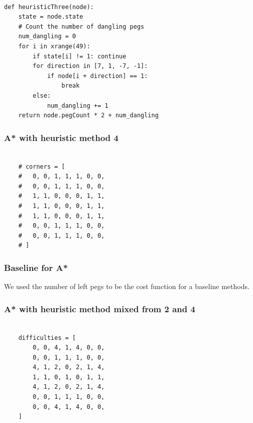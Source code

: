 \documentclass[11pt,letter]{article}
\begin{document}
\begin{lstlisting}[frame=single]  % Start your code-block

def heuristicThree(node):
	state = node.state
	# Count the number of dangling pegs
	num_dangling = 0
	for i in xrange(49):
		if state[i] != 1: continue
		for direction in [7, 1, -7, -1]:
			if node[i + direction] == 1:
				break
		else:
			num_dangling += 1
	return node.pegCount * 2 + num_dangling
\end{lstlisting}
\subsubsection {A* with heuristic method 4}

\begin{lstlisting}[frame=single]  % Start your code-block

	# corners = [
	# 	0, 0, 1, 1, 1, 0, 0,
	# 	0, 0, 1, 1, 1, 0, 0,
	# 	1, 1, 0, 0, 0, 1, 1,
	# 	1, 1, 0, 0, 0, 1, 1,
	# 	1, 1, 0, 0, 0, 1, 1,
	# 	0, 0, 1, 1, 1, 0, 0,
	# 	0, 0, 1, 1, 1, 0, 0,
	# ]
\end{lstlisting}
\subsubsection {Baseline for A*}
We used the number of left pegs to be the cost function for a baseline methods.

\subsubsection {A* with heuristic method mixed from 2 and 4}

\begin{lstlisting}[frame=single]  % Start your code-block

	difficulties = [
		0, 0, 4, 1, 4, 0, 0,
		0, 0, 1, 1, 1, 0, 0,
		4, 1, 2, 0, 2, 1, 4,
		1, 1, 0, 1, 0, 1, 1,
		4, 1, 2, 0, 2, 1, 4,
		0, 0, 1, 1, 1, 0, 0,
		0, 0, 4, 1, 4, 0, 0,
	]
\end{lstlisting}
\end{document}
